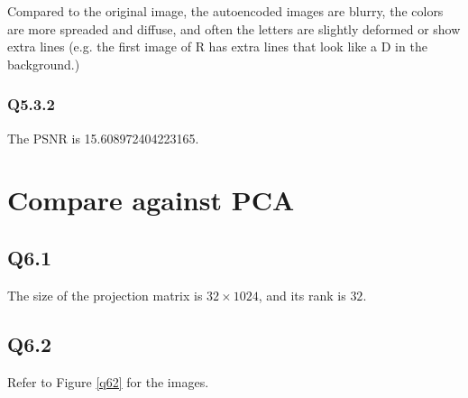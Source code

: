 \documentclass{article} %
\begin{document}
    Compared to the original image, the autoencoded images are blurry, the colors are more spreaded and diffuse, and often the letters are slightly deformed or show extra lines (e.g. the first image of R has extra lines that look like a D in the background.)

    \subsubsection*{Q5.3.2}

    The PSNR is 15.608972404223165.

    \section{Compare against PCA}
    \subsection*{Q6.1}

    The size of the projection matrix is $32\times1024$, and its rank is $32$.

    \subsection*{Q6.2}

    Refer to Figure \ref{q62} for the images.

    \medskip
    
\end{document}
